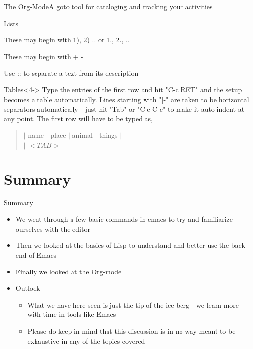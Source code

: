 \documentclass{beamer}
\begin{document}
\begin{frame}{The Org-Mode}{A goto tool for cataloging and tracking your activities}
\begin{block}{Lists}
\begin{description}
\item<1->[Ordered Lists] These may begin with 1), 2) .. or 1., 2., .. 
\item<2->[Unordered Lists] These may begin with + - 
\item<3->[Description Lists] Use :: to separate a text from its description
\end{description}
\end{block}
\begin{block}{Tables}<4->
Type the entries of the first row and hit "C-c RET" and the setup becomes a table automatically. Lines starting with "$|$-" are taken to be horizontal separators automatically - just hit "Tab" or "C-c C-c" to make it auto-indent at any point. The first row will have to be typed as,
\begin{quote}
$|$ name $|$ place $|$ animal $|$ things $|$\\
$|$-$<TAB>$\\
\end{quote}
\end{block}
\end{frame}
\section*{Summary}

\begin{frame}{Summary}
  \begin{itemize}
  \item
    We went through a few \alert{basic commands} in emacs to try and familiarize ourselves with the editor
  \item
    Then we looked at the \alert{basics of Lisp} to understand and better use the back end of Emacs
  \item
	Finally we looked at the Org-mode
  \end{itemize}
  
  \begin{itemize}
  \item
    Outlook
    \begin{itemize}
    \item
	  What we have here seen is just the tip of the ice berg - we learn more with time in tools like Emacs
    \item
      Please do keep in mind that this discussion is in no way meant to be exhaustive in any of the topics covered
    \end{itemize}
  \end{itemize}
\end{frame}
\end{document}
